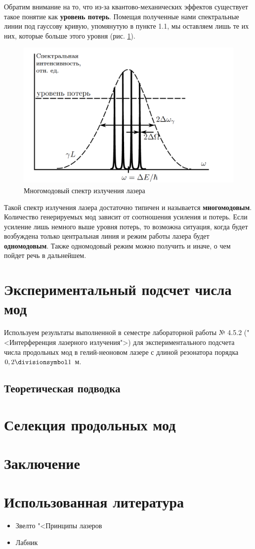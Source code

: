 \documentclass[12pt]{kiarticle}
\begin{document}
Обратим внимание на то, что из-за квантово-механических эффектов существует такое понятие как \textbf{уровень потерь}. Помещая полученные нами спектральные линии под гауссову кривую, упомянутую в пункте 1.1, мы оставляем лишь те их них, которые больше этого уровня (рис. \ref{mods}).

\begin{figure}[h!]
	\centering
	\includegraphics[width=0.7\linewidth]{mods.png}
	\caption{Многомодовый спектр излучения лазера}
	\label{mods}
\end{figure}

Такой спектр излучения лазера достаточно типичен и называется \textbf{многомодовым}. Количество генерируемых мод
зависит от соотношения усиления и потерь. Если усиление лишь немного выше уровня потерь, то возможна ситуация, когда будет возбуждена
только центральная линия и режим работы лазера будет \textbf{одномодовым}. Также одномодовый режим можно получить и иначе, о чем пойдет речь в дальнейшем.

\section{Экспериментальный подсчет числа мод}

Используем результаты выполненной в семестре лабораторной работы № 4.5.2 ("<Интерференция лазерного излучения">) для экспериментального подсчета числа продольных мод в гелий-неоновом лазере с длиной резонатора порядка $ 0,2 \divisionsymbol 1 $ м.

\subsection{Теоретическая подводка}




\newpage
\section{Селекция продольных мод}


\newpage
\section{Заключение}

\section*{Использованная литература}

\begin{itemize}
	
	\item Звелто "<Принципы лазеров
	
	\item Лабник
	
\end{itemize}
\end{document}
